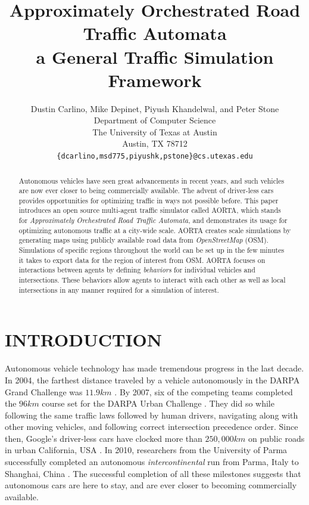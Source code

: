\documentclass[letterpaper, 10 pt, conference]{ieeeconf}  %
\title{\LARGE \bf
Approximately Orchestrated Road Traffic Automata\\
a General Traffic Simulation Framework
}
\author{Dustin Carlino, Mike Depinet, Piyush Khandelwal, and Peter Stone\\
        Department of Computer Science\\
        The University of Texas at Austin\\
        Austin, TX 78712\\
        {\tt \small\{dcarlino,msd775,piyushk,pstone\}@cs.utexas.edu}}
\begin{document}
\maketitle
\thispagestyle{empty}
\pagestyle{empty}


\begin{abstract} 
Autonomous vehicles have seen great advancements in recent years, and
such vehicles are now ever closer to being commercially available.
The advent of driver-less cars provides opportunities for optimizing
traffic in ways not possible before. This paper introduces an open
source multi-agent traffic simulator called AORTA, which stands for
\textit{Approximately Orchestrated Road Traffic Automata}, and
demonstrates its usage for optimizing autonomous traffic at a
city-wide scale. AORTA creates scale simulations by generating maps
using publicly available road data from \textit{OpenStreetMap}
(OSM). Simulations of specific regions throughout the world can be set
up in the few minutes it takes to export data for the region of
interest from OSM. AORTA focuses on interactions between agents by
defining \textit{behaviors} for individual vehicles and
intersections. These behaviors allow agents to interact with each
other as well as local intersections in any manner required for a
simulation of interest.
\end{abstract}


\section{INTRODUCTION}
\label{sec:introduction}


Autonomous vehicle technology has made tremendous progress in the last decade.
In 2004, the farthest distance traveled by a vehicle autonomously in the DARPA
Grand Challenge was $11.9km$ \cite{cnnGrandChallenge2004}. By 2007, six of the
competing teams completed the $96km$ course set for the DARPA Urban Challenge
\cite{spectrumUrbanChallenge2007}. They did so while following the same traffic
laws followed by human drivers, navigating along with other moving vehicles,
and following correct intersection precedence order. Since then, Google's
driver-less cars have clocked more than $250,000km$ on public roads in urban
California, USA \cite{tedThrun2011}. In 2010, researchers from the University
of Parma successfully completed an autonomous \textit{intercontinental} run
from Parma, Italy to Shanghai, China \cite{cnnVislab2010}. The successful
completion of all these milestones suggests that autonomous cars are here to
stay, and are ever closer to becoming commercially available. 
\end{document}
